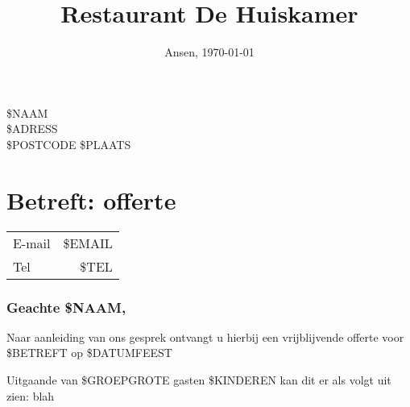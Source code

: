 \documentclass{scrartcl}
\begin{document}
\title{Restaurant De Huiskamer}
\date{Ansen, \today}
\maketitle

\thispagestyle{fancy}

\begin{flushright}
	\$NAAM \\
	\$ADRESS \\
	\$POSTCODE \$PLAATS
\end{flushright}
\section*{Betreft: offerte}
\begin{tabular}{ l r }
  E-mail & \$EMAIL  \\
  Tel & \$TEL  \\
\end{tabular}


\subsubsection*{Geachte \$NAAM,}

Naar aanleiding van ons gesprek ontvangt u hierbij een vrijblijvende offerte
voor \$BETREFT op \$DATUMFEEST

Uitgaande van \$GROEPGROTE gasten \$KINDEREN kan dit er als volgt uit zien:
\newpage
blah
\end{document}
